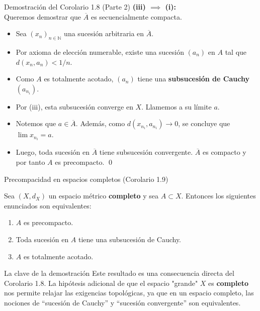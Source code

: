 \begin{frame}{Demostración del Corolario 1.8 (Parte 2)}
    \textbf{(iii) $\implies$ (i):}\\
    Queremos demostrar que $\overline{A}$ es secuencialmente compacta.
    \begin{itemize}
        \item Sea $(x_n)_{n\in\mathbb{N}}$ una sucesión arbitraria en $\overline{A}$.
        \item Por axioma de elección numerable, existe una sucesión $(a_n)$ en $A$ tal que $d(x_n, a_n) < 1/n$.
        \item Como $A$ es totalmente acotado, $(a_n)$ tiene una \textbf{subsucesión de Cauchy} $(a_{n_i})$.
        \item Por (iii), esta subsucesión converge en $X$. Llamemos a su límite $a$.
        \item Notemos que $a \in \overline{A}$. Además, como $d(x_{n_i}, a_{n_i}) \to 0$, se concluye que $\lim x_{n_i} = a$.
        \item Luego, toda sucesión en $\overline{A}$ tiene subsucesión convergente. $\overline{A}$ es compacto y por tanto $A$ es precompacto. \qed
    \end{itemize}
\end{frame}

\begin{frame}{Precompacidad en espacios completos (Corolario 1.9)}
    \begin{corolario}
        Sea $(X, d_X)$ un espacio métrico \textbf{completo} y sea $A\subset X$. Entonces los siguientes enunciados son equivalentes:
        \begin{enumerate}
            \item[(i)] $A$ es precompacto.
            \item[(ii)] Toda sucesión en $A$ tiene una subsucesión de Cauchy.
            \item[(iii)] $A$ es totalmente acotado.
        \end{enumerate}
    \end{corolario}
    
    \vspace{0.4cm}
    \begin{block}{La clave de la demostración}
        Este resultado es una consecuencia directa del Corolario 1.8. La hipótesis adicional de que el espacio "grande" $X$ es \textbf{completo} nos permite relajar las exigencias topológicas, ya que en un espacio completo, las nociones de ``sucesión de Cauchy'' y ``sucesión convergente'' son equivalentes.
    \end{block}
\end{frame}

